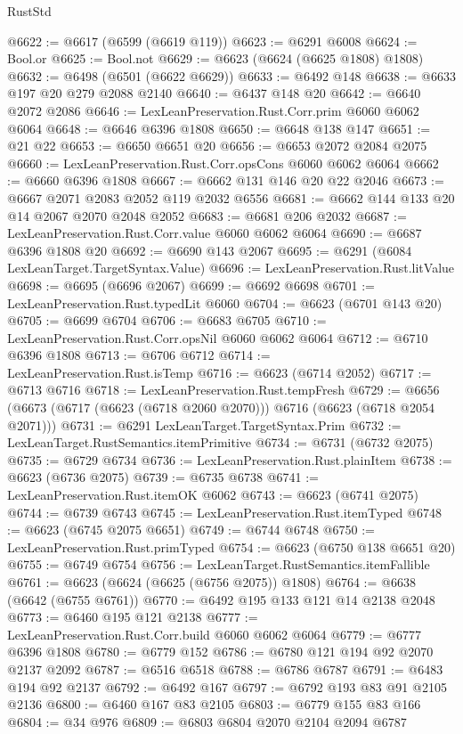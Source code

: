 \begin{lexlean}{RustStd}
\begin{coremodule}
@6622 := @6617 (@6599 (@6619 @119))
@6623 := @6291 @6008
@6624 := Bool.or
@6625 := Bool.not
@6629 := @6623 (@6624 (@6625 @1808) @1808)
@6632 := @6498 (@6501 (@6622 @6629))
@6633 := @6492 @148
@6638 := @6633 @197 @20 @279 @2088 @2140
@6640 := @6437 @148 @20
@6642 := @6640 @2072 @2086
@6646 := LexLeanPreservation.Rust.Corr.prim @6060 @6062 @6064
@6648 := @6646 @6396 @1808
@6650 := @6648 @138 @147
@6651 := @21 @22
@6653 := @6650 @6651 @20
@6656 := @6653 @2072 @2084 @2075
@6660 := LexLeanPreservation.Rust.Corr.opsCons @6060 @6062 @6064
@6662 := @6660 @6396 @1808
@6667 := @6662 @131 @146 @20 @22 @2046
@6673 := @6667 @2071 @2083 @2052 @119 @2032 @6556
@6681 := @6662 @144 @133 @20 @14 @2067 @2070 @2048 @2052
@6683 := @6681 @206 @2032
@6687 := LexLeanPreservation.Rust.Corr.value @6060 @6062 @6064
@6690 := @6687 @6396 @1808 @20
@6692 := @6690 @143 @2067
@6695 := @6291 (@6084 LexLeanTarget.TargetSyntax.Value)
@6696 := LexLeanPreservation.Rust.litValue
@6698 := @6695 (@6696 @2067)
@6699 := @6692 @6698
@6701 := LexLeanPreservation.Rust.typedLit @6060
@6704 := @6623 (@6701 @143 @20)
@6705 := @6699 @6704
@6706 := @6683 @6705
@6710 := LexLeanPreservation.Rust.Corr.opsNil @6060 @6062 @6064
@6712 := @6710 @6396 @1808
@6713 := @6706 @6712
@6714 := LexLeanPreservation.Rust.isTemp
@6716 := @6623 (@6714 @2052)
@6717 := @6713 @6716
@6718 := LexLeanPreservation.Rust.tempFresh
@6729 := @6656 (@6673 (@6717 (@6623 (@6718 @2060 @2070))) @6716 (@6623 (@6718 @2054 @2071)))
@6731 := @6291 LexLeanTarget.TargetSyntax.Prim
@6732 := LexLeanTarget.RustSemantics.itemPrimitive
@6734 := @6731 (@6732 @2075)
@6735 := @6729 @6734
@6736 := LexLeanPreservation.Rust.plainItem
@6738 := @6623 (@6736 @2075)
@6739 := @6735 @6738
@6741 := LexLeanPreservation.Rust.itemOK @6062
@6743 := @6623 (@6741 @2075)
@6744 := @6739 @6743
@6745 := LexLeanPreservation.Rust.itemTyped
@6748 := @6623 (@6745 @2075 @6651)
@6749 := @6744 @6748
@6750 := LexLeanPreservation.Rust.primTyped
@6754 := @6623 (@6750 @138 @6651 @20)
@6755 := @6749 @6754
@6756 := LexLeanTarget.RustSemantics.itemFallible
@6761 := @6623 (@6624 (@6625 (@6756 @2075)) @1808)
@6764 := @6638 (@6642 (@6755 @6761))
@6770 := @6492 @195 @133 @121 @14 @2138 @2048
@6773 := @6460 @195 @121 @2138
@6777 := LexLeanPreservation.Rust.Corr.build @6060 @6062 @6064
@6779 := @6777 @6396 @1808
@6780 := @6779 @152
@6786 := @6780 @121 @194 @92 @2070 @2137 @2092
@6787 := @6516 @6518
@6788 := @6786 @6787
@6791 := @6483 @194 @92 @2137
@6792 := @6492 @167
@6797 := @6792 @193 @83 @91 @2105 @2136
@6800 := @6460 @167 @83 @2105
@6803 := @6779 @155 @83 @166
@6804 := @34 @976
@6809 := @6803 @6804 @2070 @2104 @2094 @6787

\end{coremodule}
\end{lexlean}
